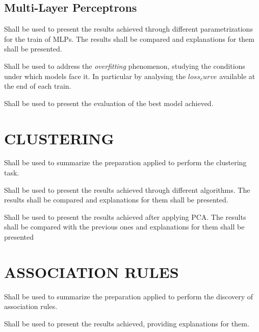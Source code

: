 \documentclass[11pt]{article}
\begin{document}

\subsection{Multi-Layer Perceptrons}
\begin{tcolorbox} %
Shall be used to present the results achieved through different parametrizations for the train of MLPs. The results shall be compared and explanations for them shall be presented.
\end{tcolorbox} %
\begin{tcolorbox} %
Shall be used to address the \textit{overfitting} phenomenon, studying the conditions under which models face it. In particular by analysing the $loss_curve$ available at the end of each train.
\end{tcolorbox} %
\begin{tcolorbox} %
Shall be used to present the evaluation of the best model achieved.
\end{tcolorbox} %


\section{CLUSTERING}
\begin{tcolorbox} %
Shall be used to summarize the preparation applied to perform the clustering task. 
\end{tcolorbox} %
\begin{tcolorbox} %
Shall be used to present the results achieved through different algorithms. The
results shall be compared and explanations for them shall be presented.
\end{tcolorbox} %
\begin{tcolorbox} %
Shall be used to present the results achieved after applying PCA. The results shall be compared with the previous ones and explanations for them shall be presented
\end{tcolorbox} %


\section{ASSOCIATION RULES}
\begin{tcolorbox} %
Shall be used to summarize the preparation applied to perform the discovery of association rules. 
\end{tcolorbox} %
\begin{tcolorbox} %
Shall be used to present the results achieved, providing explanations for them.
\end{tcolorbox} %
\end{document}
